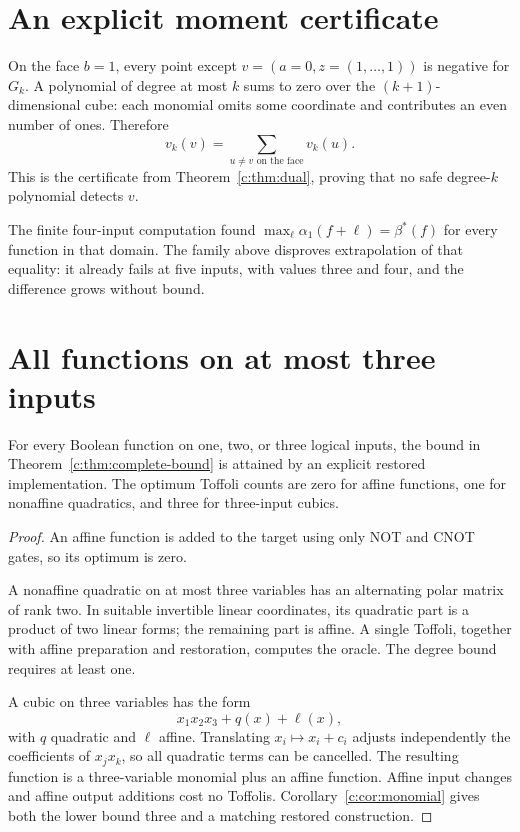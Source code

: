 \section{An explicit moment certificate}
On the face $b=1$, every point except $v=(a=0,z=(1,\ldots,1))$ is negative for $G_k$. A polynomial of degree at most $k$ sums to zero over the $(k+1)$-dimensional cube: each monomial omits some coordinate and contributes an even number of ones. Therefore
\[
 v_k(v)=\sum_{u\ne v\text{ on the face}}v_k(u).
\]
This is the certificate from Theorem~\ref{c:thm:dual}, proving that no safe degree-$k$ polynomial detects $v$.

The finite four-input computation found $\max_\ell\alpha_1(f+\ell)=\beta^*(f)$ for every function in that domain. The family above disproves extrapolation of that equality: it already fails at five inputs, with values three and four, and the difference grows without bound.

\section{All functions on at most three inputs}
\begin{theorem}\label{c:thm:small-oracles}
For every Boolean function on one, two, or three logical inputs, the bound in Theorem~\ref{c:thm:complete-bound} is attained by an explicit restored implementation. The optimum Toffoli counts are zero for affine functions, one for nonaffine quadratics, and three for three-input cubics.
\end{theorem}
\begin{proof}
An affine function is added to the target using only NOT and CNOT gates, so its optimum is zero.

A nonaffine quadratic on at most three variables has an alternating polar matrix of rank two. In suitable invertible linear coordinates, its quadratic part is a product of two linear forms; the remaining part is affine. A single Toffoli, together with affine preparation and restoration, computes the oracle. The degree bound requires at least one.

A cubic on three variables has the form
\[
 x_1x_2x_3+q(x)+\ell(x),
\]
with $q$ quadratic and $\ell$ affine. Translating $x_i\mapsto x_i+c_i$ adjusts independently the coefficients of $x_jx_k$, so all quadratic terms can be cancelled. The resulting function is a three-variable monomial plus an affine function. Affine input changes and affine output additions cost no Toffolis. Corollary~\ref{c:cor:monomial} gives both the lower bound three and a matching restored construction.
\end{proof}

